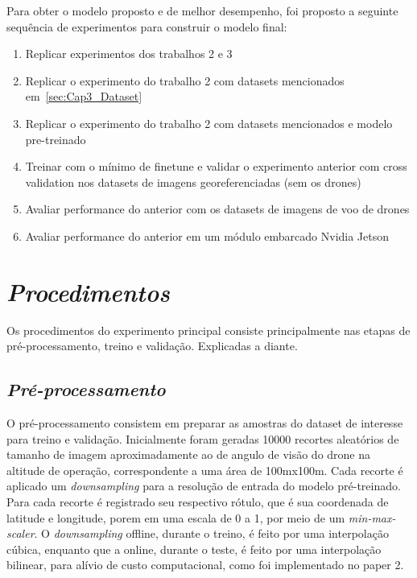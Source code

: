 Para obter o modelo proposto e de melhor desempenho, foi proposto a seguinte sequência de experimentos para construir o modelo final:

\begin{enumerate}
\item  Replicar experimentos dos trabalhos 2 e 3
\item  Replicar o experimento do trabalho 2 com datasets mencionados em~\ref{sec:Cap3_Dataset}
\item  Replicar o experimento do trabalho 2 com datasets mencionados e modelo pre-treinado
\item Treinar com o mínimo de finetune e validar o experimento anterior com cross validation nos datasets de imagens georeferenciadas (sem os drones)
\item Avaliar performance do anterior com os datasets de imagens de voo de drones
\item Avaliar performance do anterior em um módulo embarcado Nvidia Jetson
\end{enumerate}


    

\section{\textit{Procedimentos}}\label{sec:Cap3_Procedimentos}

Os procedimentos do experimento principal consiste principalmente nas etapas de 
pré-processamento, treino e validação. Explicadas a diante.

\subsection{\textit{Pré-processamento}}\label{sec:Cap3_PreProcess}
O pré-processamento consistem em preparar as amostras do dataset de interesse para treino e validação. Inicialmente foram geradas 10000 recortes aleatórios de tamanho de imagem aproximadamente ao de angulo de visão do drone na altitude de operação, correspondente a uma área de 100mx100m. Cada recorte é aplicado um \textit{downsampling} para a resolução de entrada do modelo pré-treinado. Para cada recorte é registrado seu respectivo rótulo, que é sua coordenada de latitude e longitude, porem em uma escala de 0 a 1, por meio de um \textit{min-max-scaler}. O \textit{downsampling} offline, durante o treino, é feito por uma interpolação cúbica, enquanto que a online, durante o teste, é feito por uma interpolação bilinear, para alívio de custo computacional, como foi implementado no paper 2.

